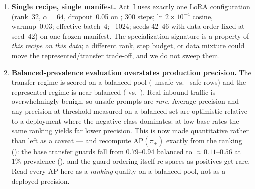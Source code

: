 \begin{enumerate}[leftmargin=1.6em,itemsep=2pt]
  \item \textbf{Single recipe, single manifest.} Act~I uses exactly one LoRA configuration (rank~32, $\alpha{=}64$, dropout~0.05 on ; 300 steps; lr~$2\!\times\!10^{-4}$ cosine, warmup~0.03; effective batch~4; ~1024; seeds 42--46 with data order fixed at seed~42) on one frozen manifest. The specialization signature is a property of \emph{this recipe on this data}; a different rank, step budget, or data mixture could move the represented/transfer trade-off, and we do not sweep them.

  \item \textbf{Balanced-prevalence evaluation overstates production precision.} The transfer regime is scored on a balanced pool (\TransferPositiveN{} unsafe vs.\ \TransferNegativeN{} safe rows) and the represented regime is near-balanced (\RepPositiveN{} vs.\ \RepNegativeN{}). Real inbound traffic is overwhelmingly benign, so unsafe prompts are \emph{rare}. Average precision and any precision-at-threshold measured on a balanced set are optimistic relative to a deployment where the negative class dominates: at low base rates the same ranking yields far lower precision. This is now made quantitative rather than left as a caveat ---  and  recompute $\mathrm{AP}(\pi_+)$ exactly from the ranking (): the base transfer guards fall from $0.79$--$0.94$ balanced to $\approx0.11$--$0.56$ at $1\%$ prevalence (), and the guard ordering itself re-spaces as positives get rare. Read every AP here as a \emph{ranking} quality on a balanced pool, not as a deployed precision.


\end{enumerate}
